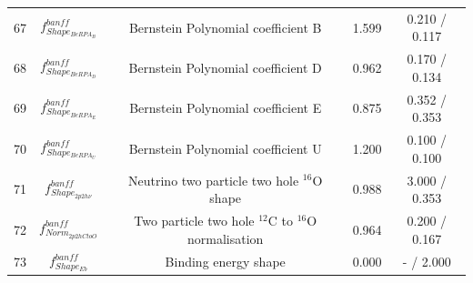 \begin{tabular} { | c | c | c | c | c |  }
67 & $f_{Shape_{BeRPA_{B}}}^{banff}$ & Bernstein Polynomial coefficient B & 1.599 & 0.210 / 0.117\\ 
68 & $f_{Shape_{BeRPA_{D}}}^{banff}$ & Bernstein Polynomial coefficient D & 0.962 & 0.170 / 0.134\\ 
69 & $f_{Shape_{BeRPA_{E}}}^{banff}$ & Bernstein Polynomial coefficient E & 0.875 & 0.352 / 0.353\\ 
70 & $f_{Shape_{BeRPA_{U}}}^{banff}$ & Bernstein Polynomial coefficient U & 1.200 & 0.100 / 0.100\\ 
71 & $f_{Shape_{2p2h\nu}}^{banff}$ & Neutrino two particle two hole $^{16}$O shape & 0.988 & 3.000 / 0.353\\ 
72 & $f_{Norm_{2p2h C to O}}^{banff}$ & Two particle two hole $^{12}$C to $^{16}$O normalisation & 0.964 & 0.200 / 0.167\\ 
73 & $f_{Shape_{Eb}}^{banff}$ & Binding energy shape & 0.000 & - / 2.000\\ 

\hline

\end{tabular}